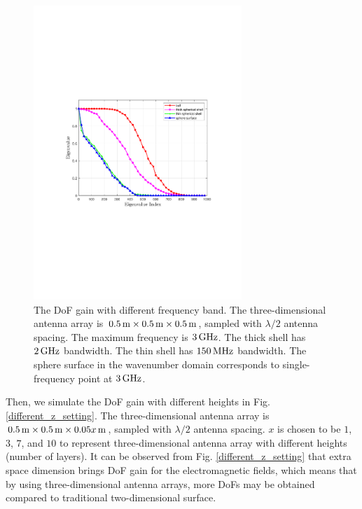 \documentclass[12pt,draftclsnofoot,journal,onecolumn]{IEEEtran}
\begin{document}
	
	\begin{figure}
		\centering 
		\includegraphics[width=0.7\textwidth]{figs/different_frequency_setting.pdf} 
		\caption{The DoF gain with different frequency band. The three-dimensional antenna array is $0.5\,{\rm m} \times 0.5\,{\rm m} \times 0.5\,{\rm m}$, sampled with $\lambda/2$ antenna spacing. The maximum frequency is $3\,{\rm GHz}$. The thick shell has $2\,{\rm GHz}$ bandwidth. The thin shell has $150\,{\rm MHz}$ bandwidth. The sphere surface in the wavenumber domain corresponds to single-frequency point at $3\,{\rm GHz}$.} 
		\label{different_frequency_setting}
	\end{figure}
	
	
	Then, we simulate the DoF gain with different heights in Fig. \ref{different_z_setting}. The three-dimensional antenna array is $0.5\,{\rm m} \times 0.5\,{\rm m} \times 0.05x\,{\rm m}$, sampled with $\lambda/2$ antenna spacing. $x$ is chosen to be $1$, $3$, $7$, and $10$ to represent three-dimensional antenna array with different heights (number of layers). It can be observed from Fig. \ref{different_z_setting} that extra space dimension brings DoF gain for the  electromagnetic fields, which means that by using three-dimensional antenna arrays, more DoFs may be obtained compared to traditional two-dimensional surface. 
	
\end{document}
